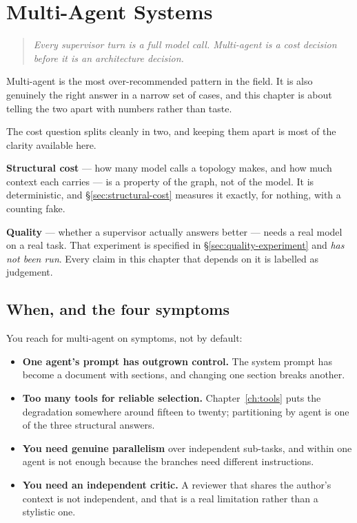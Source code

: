 \chapter{Multi-Agent Systems}
\label{ch:multi-agent}

\begin{quote}\itshape
Every supervisor turn is a full model call. Multi-agent is a cost decision before
it is an architecture decision.
\end{quote}

\noindent
Multi-agent is the most over-recommended pattern in the field. It is also
genuinely the right answer in a narrow set of cases, and this chapter is about
telling the two apart with numbers rather than taste.

The cost question splits cleanly in two, and keeping them apart is most of the
clarity available here.

\textbf{Structural cost} --- how many model calls a topology makes, and how much
context each carries --- is a property of the graph, not of the model. It is
deterministic, and \S\ref{sec:structural-cost} measures it exactly, for nothing,
with a counting fake.

\textbf{Quality} --- whether a supervisor actually answers better --- needs a
real model on a real task. That experiment is specified in
\S\ref{sec:quality-experiment} and \emph{has not been run}. Every claim in this
chapter that depends on it is labelled as judgement.

\section{When, and the four symptoms}
\label{sec:when-multi-agent}

You reach for multi-agent on symptoms, not by default:

\begin{itemize}[leftmargin=1.4em]
\item \textbf{One agent's prompt has outgrown control.} The system prompt has
      become a document with sections, and changing one section breaks another.
\item \textbf{Too many tools for reliable selection.} Chapter~\ref{ch:tools}
      puts the degradation somewhere around fifteen to twenty; partitioning by
      agent is one of the three structural answers.
\item \textbf{You need genuine parallelism} over independent sub-tasks, and
       within one agent is not enough because the branches need
      different instructions.
\item \textbf{You need an independent critic.} A reviewer that shares the
      author's context is not independent, and that is a real limitation rather
      than a stylistic one.
\end{itemize}

